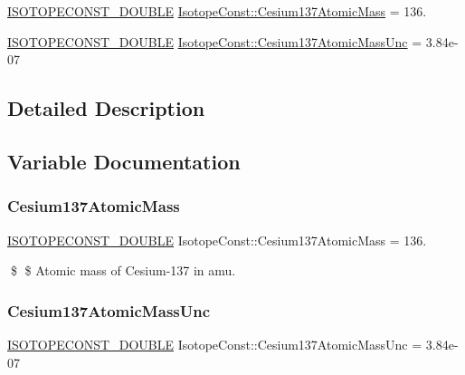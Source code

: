 \begin{DoxyCompactItemize}
\item 
\mbox{\hyperlink{group___isotope_const-_macros_ga8f45a7272ce02c0b4c65c44636ed719a}{I\+S\+O\+T\+O\+P\+E\+C\+O\+N\+S\+T\+\_\+\+D\+O\+U\+B\+LE}} \mbox{\hyperlink{group___isotope_const-_cesium-_cs137_ga8c1b819d9cf76aa8aef2dc11d0cb2c18}{Isotope\+Const\+::\+Cesium137\+Atomic\+Mass}} = 136.
\item 
\mbox{\hyperlink{group___isotope_const-_macros_ga8f45a7272ce02c0b4c65c44636ed719a}{I\+S\+O\+T\+O\+P\+E\+C\+O\+N\+S\+T\+\_\+\+D\+O\+U\+B\+LE}} \mbox{\hyperlink{group___isotope_const-_cesium-_cs137_gabdd6c1b1ef6d165c4b3bbc5319e522c3}{Isotope\+Const\+::\+Cesium137\+Atomic\+Mass\+Unc}} = 3.\+84e-\/07
\end{DoxyCompactItemize}


\subsection{Detailed Description}


\subsection{Variable Documentation}
\mbox{\label{group___isotope_const-_cesium-_cs137_ga8c1b819d9cf76aa8aef2dc11d0cb2c18}} 
\subsubsection{\texorpdfstring{Cesium137\+Atomic\+Mass}{Cesium137AtomicMass}}
{\footnotesize\ttfamily \mbox{\hyperlink{group___isotope_const-_macros_ga8f45a7272ce02c0b4c65c44636ed719a}{I\+S\+O\+T\+O\+P\+E\+C\+O\+N\+S\+T\+\_\+\+D\+O\+U\+B\+LE}} Isotope\+Const\+::\+Cesium137\+Atomic\+Mass = 136.}

\$ \$ Atomic mass of Cesium-\/137 in amu. \mbox{\label{group___isotope_const-_cesium-_cs137_gabdd6c1b1ef6d165c4b3bbc5319e522c3}} 
\subsubsection{\texorpdfstring{Cesium137\+Atomic\+Mass\+Unc}{Cesium137AtomicMassUnc}}
{\footnotesize\ttfamily \mbox{\hyperlink{group___isotope_const-_macros_ga8f45a7272ce02c0b4c65c44636ed719a}{I\+S\+O\+T\+O\+P\+E\+C\+O\+N\+S\+T\+\_\+\+D\+O\+U\+B\+LE}} Isotope\+Const\+::\+Cesium137\+Atomic\+Mass\+Unc = 3.\+84e-\/07}

